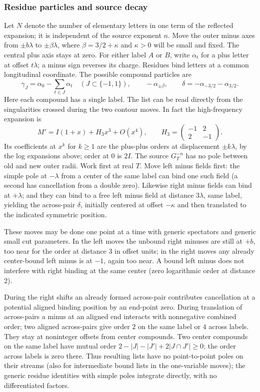 \subsubsection{Residue particles and source decay}
Let \(N\) denote the number of elementary letters in one term of the
reflected expansion; it is independent of the source exponent \(n\).
Move the outer minus axes from \(\pm b\lambda\) to
\(\pm\beta\lambda\), where \(\beta=3/2+\kappa\) and \(\kappa>0\)
will be small and fixed. The central plus axis stays at zero.
For either label \(A\) or \(B\), write \(\alpha_t\) for a plus
letter at offset \(t\lambda\); a minus sign reverses its charge.
Residues bind letters at a common longitudinal coordinate. The possible
compound particles are
\begin{equation}
 \gamma_J=\alpha_0-\sum_{t\in J}\alpha_t\quad(J\subset\{-1,1\}),\qquad
 -\alpha_{\pm\beta},\qquad \delta=-\alpha_{-3/2}-\alpha_{3/2}.               \label{c2:eq-V5}
\end{equation}
Here each compound has a single label. The list can be read directly
from the singularities crossed during the two contour moves. In fact the
high-frequency expansion is
\[
 M'=I(1+x)+H_3 x^3+O(x^4),\qquad
 H_3=\begin{pmatrix}-1&2\\2&-1\end{pmatrix}.
\]
Its coefficients at \(x^k\) for \(k\ge1\) are the plus-plus orders at displacement \(\pm k\lambda\), by the log expansions above; order at 0 is \(2I\). The source \(G_T^{-n}\) has no pole between old and new outer radii. Work first at real \(T\). Move left minus fields first: the simple pole at \(-\lambda\) from a center of the same label can bind one such field (a second has cancellation from a double zero). Likewise right minus fields can bind at \(+\lambda\); and they can bind to a free left minus field at distance \(3\lambda\), same label, yielding the across-pair \(\delta\), initially centered at offset \(-\kappa\) and then translated to the indicated symmetric position. 

These moves may be done one point at a time with generic spectators and generic small cut parameters. In the left moves the unbound right minuses are still at \(+b\), too near for the order at distance 3 in offset units; in the right moves any already center-bound left minus is at \(-1\), again too near. A bound left minus does not interfere with right binding at the same center (zero logarithmic order at distance 2).

During the right shifts an already formed across-pair contributes cancellation at a potential aligned binding position by an end-point zero. During translation of across-pairs a minus at an aligned end interacts with nonnegative combined order; two aligned across-pairs give order \(2\) on the same label or \(4\) across labels. They stay at noninteger offsets from center compounds. Two center compounds on the same label have mutual order \(2-|J|-|J'|+2|J\cap J'|\ge0\); the order across labels is zero there. Thus resulting lists have no point-to-point poles on their streams (also for intermediate bound lists in the one-variable moves); the generic residue identities with simple poles integrate directly, with no differentiated factors. 

